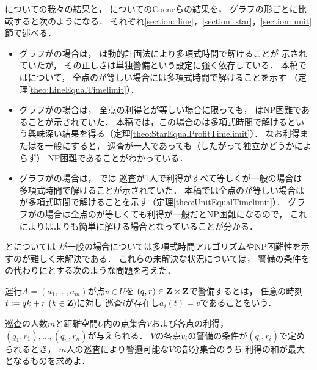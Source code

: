 {\patProb}についての我々の結果と，
{\independentPatProb}についてのCoeneらの結果を，
グラフの形ごとに比較すると次のようになる．
それぞれ\ref{section: line}，\ref{section: star}，\ref{section: unit}節で述べる．
\begin{itemize}
\item 
  グラフが{\graphLine}の場合は，
  {\independentPatProb}は動的計画法により多項式時間で解けることが
  示されていた\cite[Theorem~11]{coene2011charlemagne}が，
  その正しさは単独警備という設定に強く依存している．
  本稿では{\patProb}について，
  全点の{\idletime}が等しい場合には多項式時間で解けることを示す
  （定理\ref{theo:LineEqualTimelimit}）．
\item
  グラフが{\graphStar}の場合は，
  全点の利得と{\idletime}が等しい場合に限っても，
  {\independentPatProb}はNP困難であることが示されていた\cite[Theorem~10]{coene2011charlemagne}．
  本稿では，この場合の{\patProb}は多項式時間で解けるという興味深い結果を得る（定理\ref{theo:StarEqualProfitTimelimit}）．
  なお利得または{\idletime}を一般にすると，
  巡査が一人であっても（したがって独立かどうかによらず）
  NP困難であることがわかっている\cite[Theorems 5 and 6]{coene2011charlemagne}．
\item 
  グラフが{\graphUnit}の場合は，
  {\independentPatProb}では
  巡査が1人で利得がすべて等しく{\idletime}が一般の場合は
  多項式時間で解けることが示されていた\cite[Theorem~7]{coene2011charlemagne}．
  本稿では全点の{\idletime}が等しい場合は{\patProb}が多項式時間で解けることを示す（定理\ref{theo:UnitEqualTimelimit}）．
  グラフが{\graphStar}の場合は全点の{\idletime}が等しくても利得が一般だとNP困難になるので，
  これにより{\graphUnit}は{\graphStar}よりも簡単に解ける場合となっていることが分かる．
\end{itemize}


{\graphLine}と{\graphUnit}については
{\idletime}が一般の場合については多項式時間アルゴリズムやNP困難性を示すのが難しく未解決である．
これらの未解決な状況については，
警備の条件を{\idletime}の代わりに{\exactIdletime}とする次のような問題を考えた．

\begin{defi}
運行$A = (a _1, \ldots, a _m)$が点$v \in U$を
{\exactIdletime}$(q, r) \in \mathbf Z \times \mathbf Z$で警備するとは，
任意の時刻$t := q k + r\ (k \in \mathbf Z)$に対し
巡査$i$が存在し$a _i (t) = v$であることをいう．
\end{defi}

\begin{timeSpecifiedPatrollingProblem}
巡査の人数$m$と距離空間$U$内の点集合$V$および各点の利得，
$(q_1, r_1), \ldots, (q_n, r_n)$が与えられる．
$V$の各点$v_i$の警備の条件が{\exactIdletime}$(q_i, r_i)$で定められるとき，
$m$人の巡査により警邏可能な$V$の部分集合のうち
利得の和が最大となるものを求めよ．
\end{timeSpecifiedPatrollingProblem}


